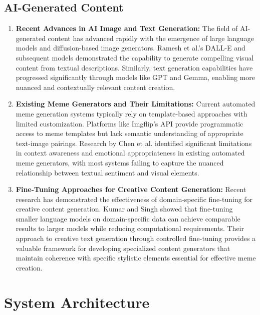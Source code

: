 \documentclass[conference]{IEEEtran}
\begin{document}
\subsection{AI-Generated Content}
\begin{enumerate}
    \item \textbf{Recent Advances in AI Image and Text Generation:} The field of AI-generated content has advanced rapidly with the emergence of large language models and diffusion-based image generators. Ramesh et al.’s DALL-E and subsequent models demonstrated the capability to generate compelling visual content from textual descriptions. Similarly, text generation capabilities have progressed significantly through models like GPT and Gemma, enabling more nuanced and contextually relevant content creation.
    \item \textbf{Existing Meme Generators and Their Limitations:} Current automated meme generation systems typically rely on template-based approaches with limited customization.  Platforms like Imgflip’s API provide programmatic access to meme templates but lack semantic understanding of appropriate text-image pairings. Research by Chen et al. identified significant limitations in context awareness and emotional appropriateness in existing automated meme generators, with most systems failing to capture the nuanced relationship between textual sentiment and visual elements.
    \item \textbf{Fine-Tuning Approaches for Creative Content Generation:} Recent research has demonstrated the effectiveness of domain-specific fine-tuning for creative content generation. Kumar and Singh showed that fine-tuning smaller language models on domain-specific data can achieve comparable results to larger models while reducing computational requirements. Their approach to creative text generation through controlled fine-tuning provides a valuable framework for developing specialized content generators that maintain coherence with specific stylistic elements essential for effective meme creation.
\end{enumerate}

%

\section{System Architecture}
\end{document}
